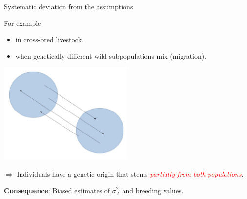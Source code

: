 \documentclass[10pt,ignorenonframetext,]{beamer}
\providecommand{\tightlist}{%
  \setlength{\itemsep}{0pt}\setlength{\parskip}{0pt}}
\begin{document}
\begin{frame}

\begin{block}{Systematic deviation from the assumptions}

\vspace{3mm}

For example

\begin{itemize}
\tightlist
\item
  in cross-bred livestock.
\item
  when genetically different wild subpopulations mix (migration).
\end{itemize}

\centering

\includegraphics[width=0.5\textwidth,height=\textheight]{graphics/2populations.jpg}

\vspace{3mm}

\flushleft

\(\Rightarrow\) Individuals have a genetic origin that stems
\emph{\textcolor{red}{partially from both populations}}.

\vspace{2mm}

\textbf{Consequence}: Biased estimates of \(\sigma_A^2\) and breeding
values.

\end{block}

\end{frame}
\end{document}
